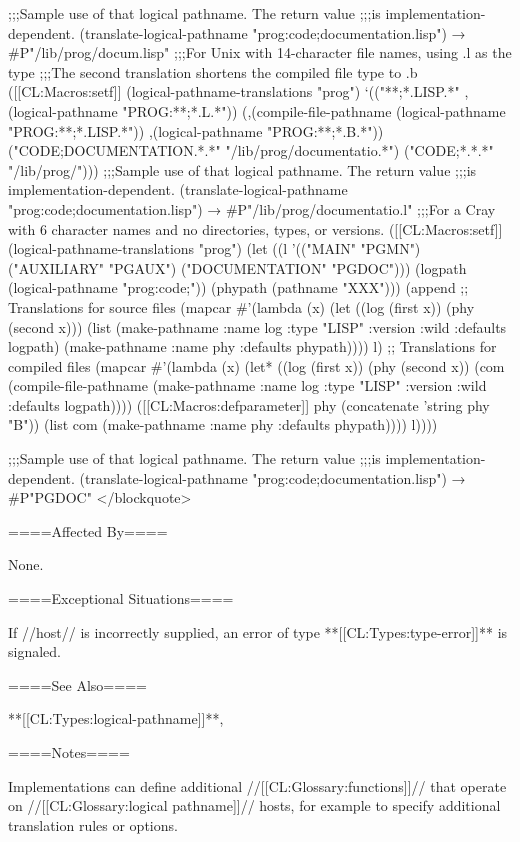 ;;;Sample use of that logical pathname. The return value ;;;is implementation-dependent. (translate-logical-pathname "prog:code;documentation.lisp") → #P"/lib/prog/docum.lisp" \medbreak ;;;For Unix with 14-character file names, using .l as the type ;;;The second translation shortens the compiled file type to .b ([[CL:Macros:setf]] (logical-pathname-translations "prog") `(("**;*.LISP.*" ,(logical-pathname "PROG:**;*.L.*")) (,(compile-file-pathname (logical-pathname "PROG:**;*.LISP.*")) ,(logical-pathname "PROG:**;*.B.*")) ("CODE;DOCUMENTATION.*.*" "/lib/prog/documentatio.*") ("CODE;*.*.*" "/lib/prog/"))) \smallbreak ;;;Sample use of that logical pathname. The return value ;;;is implementation-dependent. (translate-logical-pathname "prog:code;documentation.lisp") → #P"/lib/prog/documentatio.l" \medbreak ;;;For a Cray with 6 character names and no directories, types, or versions. ([[CL:Macros:setf]] (logical-pathname-translations "prog") (let ((l '(("MAIN" "PGMN") ("AUXILIARY" "PGAUX") ("DOCUMENTATION" "PGDOC"))) (logpath (logical-pathname "prog:code;")) (phypath (pathname "XXX"))) (append ;; Translations for source files (mapcar #'(lambda (x) (let ((log (first x)) (phy (second x))) (list (make-pathname :name log :type "LISP" :version :wild :defaults logpath) (make-pathname :name phy :defaults phypath)))) l) ;; Translations for compiled files (mapcar #'(lambda (x) (let* ((log (first x)) (phy (second x)) (com (compile-file-pathname (make-pathname :name log :type "LISP" :version :wild :defaults logpath)))) ([[CL:Macros:defparameter]] phy (concatenate 'string phy "B")) (list com (make-pathname :name phy :defaults phypath)))) l))))

;;;Sample use of that logical pathname. The return value ;;;is implementation-dependent. (translate-logical-pathname "prog:code;documentation.lisp") → #P"PGDOC" </blockquote>

====Affected By====

None.

====Exceptional Situations====

If //host// is incorrectly supplied, an error of type **[[CL:Types:type-error]]** is signaled.

====See Also====

**[[CL:Types:logical-pathname]]**, {\secref\PathnamesAsFilenames}

====Notes====

Implementations can define additional //[[CL:Glossary:functions]]// that operate on //[[CL:Glossary:logical pathname]]// hosts, for example to specify additional translation rules or options.


 
